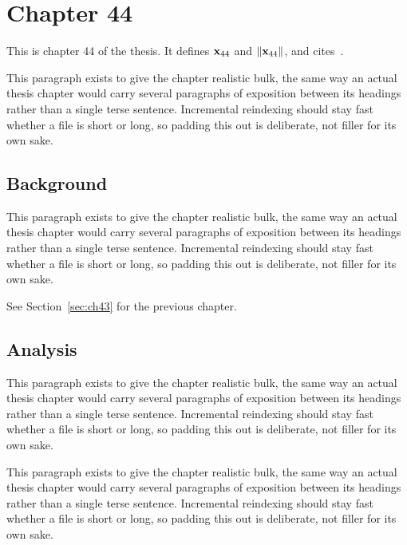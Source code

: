 \section{Chapter 44}
\label{sec:ch44}

This is chapter 44 of the thesis. It defines $\mathbf{x}_{44}$ and $\lVert \mathbf{x}_{44} \rVert$, and cites~\cite{ref1}.

This paragraph exists to give the chapter realistic bulk, the same way an actual thesis chapter would carry several paragraphs of exposition between its headings rather than a single terse sentence. Incremental reindexing should stay fast whether a file is short or long, so padding this out is deliberate, not filler for its own sake.

\subsection{Background}
\label{sec:ch44:background}

This paragraph exists to give the chapter realistic bulk, the same way an actual thesis chapter would carry several paragraphs of exposition between its headings rather than a single terse sentence. Incremental reindexing should stay fast whether a file is short or long, so padding this out is deliberate, not filler for its own sake.

See Section~\ref{sec:ch43} for the previous chapter.

\subsection{Analysis}
\label{sec:ch44:analysis}

This paragraph exists to give the chapter realistic bulk, the same way an actual thesis chapter would carry several paragraphs of exposition between its headings rather than a single terse sentence. Incremental reindexing should stay fast whether a file is short or long, so padding this out is deliberate, not filler for its own sake.

This paragraph exists to give the chapter realistic bulk, the same way an actual thesis chapter would carry several paragraphs of exposition between its headings rather than a single terse sentence. Incremental reindexing should stay fast whether a file is short or long, so padding this out is deliberate, not filler for its own sake.
